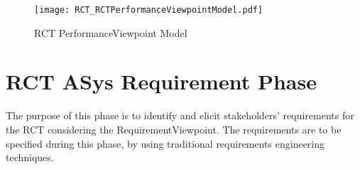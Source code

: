 \begin{figure}[htbp]
\begin{center}
 {\texttt{[image: RCT\_RCTPerformanceViewpointModel.pdf]}}
\end{center}
\caption{RCT PerformanceViewpoint Model}
\label{fig:RCTperformanceviewpointmodel}
\end{figure}


\section{RCT ASys Requirement Phase}

The purpose of this phase is to identify and elicit stakeholders' requirements for the RCT considering the RequirementViewpoint. The requirements are to be specified during this phase, by using traditional requirements engineering techniques.\\ 

